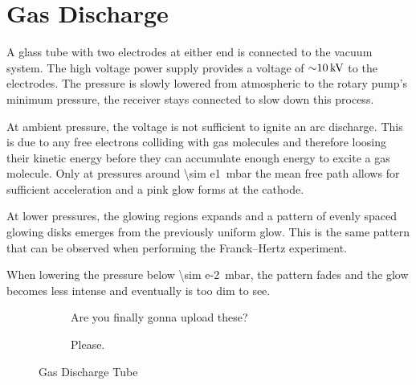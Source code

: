 \chapter{Gas Discharge}

A glass tube with two electrodes at either end is connected to the vacuum system.
The high voltage power supply provides a voltage of $\SI{\sim10}{\kV}$ to the electrodes.
The pressure is slowly lowered from atmospheric to the rotary pump's minimum pressure, the receiver stays connected to slow down this process.

At ambient pressure, the voltage is not sufficient to ignite an arc discharge.
This is due to any free electrons colliding with gas molecules and therefore loosing their kinetic energy  before they can accumulate enough energy to excite a gas molecule.
Only at pressures around \SI{\sim e1}{\milli\bar} the mean free path allows for sufficient acceleration and a pink glow forms at the cathode.

At lower pressures, the glowing regions expands and a pattern of evenly spaced glowing disks emerges from the previously uniform glow.
This is the same pattern that can be observed when performing the Franck–Hertz experiment.

When lowering the pressure below \SI{\sim e-2}{\milli\bar}, the pattern fades and the glow becomes less intense and eventually is too dim to see.

\begin{figure}[b!]
	\begin{subfigure}{.45\textwidth}
		\centering
		\caption{Are you finally gonna upload these?}
	\end{subfigure}
	\begin{subfigure}{.45\textwidth}
		\centering
		\caption{Please.}
	\end{subfigure}
	\caption{Gas Discharge Tube}
\end{figure}
